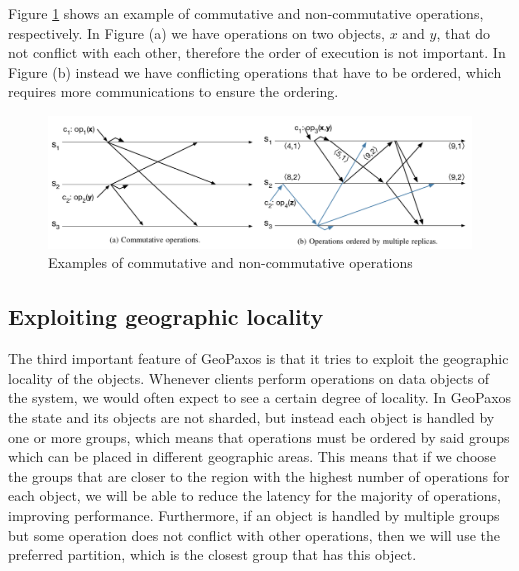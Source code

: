 Figure \ref{fig:partial-ordering} shows an example of commutative and non-commutative operations, respectively. In Figure (a) we have operations on two objects, $x$ and $y$, that do not conflict with each other, therefore the order of execution is not important. In Figure (b) instead we have conflicting operations that have to be ordered, which requires more communications to ensure the ordering.

\begin{figure}[htb]
  \centering
  \includegraphics[width=\textwidth,height=\textheight,keepaspectratio]{img/partial-ordering.png}

  \caption{ Examples of commutative and non-commutative operations }
  \label{fig:partial-ordering}
\end{figure}

\subsection{Exploiting geographic locality}
The third important feature of GeoPaxos is that it tries to exploit the geographic locality of the objects. Whenever clients perform operations on data objects of the system, we would often expect to see a certain degree of locality. In GeoPaxos the state and its objects are not sharded, but instead each object is handled by one or more groups, which means that operations must be ordered by said groups which can be placed in different geographic areas. This means that if we choose the groups that are closer to the region with the highest number of operations for each object, we will be able to reduce the latency for the majority of operations, improving  performance. Furthermore, if an object is handled by multiple groups but some operation does not conflict with other operations, then we will use the preferred partition, which is the closest group that has this object. 